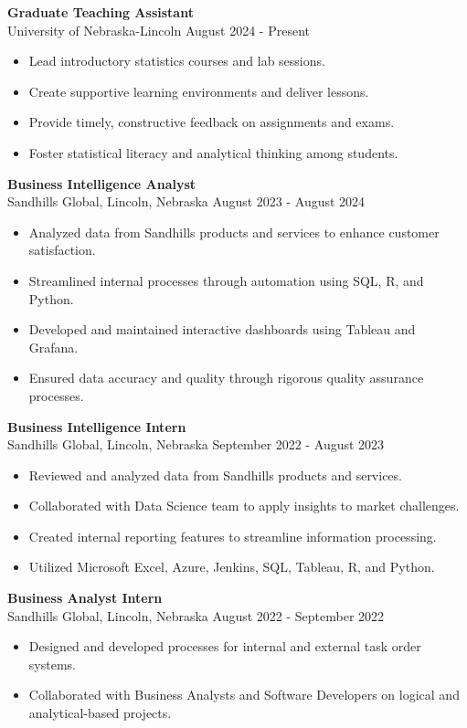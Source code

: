 \documentclass[a4paper,10pt]{article}
\begin{document}
\textbf{Graduate Teaching Assistant} \\
University of Nebraska-Lincoln \hfill August 2024 - Present
\begin{itemize}[noitemsep, topsep=0pt]
    \item Lead introductory statistics courses and lab sessions.
    \item Create supportive learning environments and deliver lessons.
    \item Provide timely, constructive feedback on assignments and exams.
    \item Foster statistical literacy and analytical thinking among students.
\end{itemize} 
\textbf{Business Intelligence Analyst} \\
Sandhills Global, Lincoln, Nebraska \hfill August 2023 - August 2024
\begin{itemize}[noitemsep, topsep=0pt]
    \item Analyzed data from Sandhills products and services to enhance customer satisfaction.
    \item Streamlined internal processes through automation using SQL, R, and Python.
    \item Developed and maintained interactive dashboards using Tableau and Grafana.
    \item Ensured data accuracy and quality through rigorous quality assurance processes.
\end{itemize}
\textbf{Business Intelligence Intern} \\
Sandhills Global, Lincoln, Nebraska \hfill September 2022 - August 2023
\begin{itemize}[noitemsep, topsep=0pt]
    \item Reviewed and analyzed data from Sandhills products and services.
    \item Collaborated with Data Science team to apply insights to market challenges.
    \item Created internal reporting features to streamline information processing.
    \item Utilized Microsoft Excel, Azure, Jenkins, SQL, Tableau, R, and Python.
\end{itemize}
\textbf{Business Analyst Intern} \\
Sandhills Global, Lincoln, Nebraska \hfill August 2022 - September 2022
\begin{itemize}[noitemsep, topsep=0pt]
    \item Designed and developed processes for internal and external task order systems.
    \item Collaborated with Business Analysts and Software Developers on logical and analytical-based projects.
\end{itemize}
\end{document}
